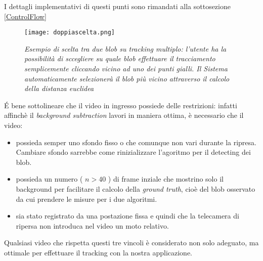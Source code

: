 I dettagli implementativi di questi punti sono rimandati alla sottosezione  \ref{ControlFlow}

\begin{figure}[hb]
\centering
	\texttt{[image: doppiascelta.png]}
\caption[Esempio di scelta tra due blob]{\textit{Esempio di scelta tra due blob su tracking multiplo: l'utente ha la possibilità di sccegliere su quale blob effettuare il tracciamento semplicemente cliccando vicino ad uno dei punti gialli. Il Sistema automaticamente selezionerà il blob più vicino attraverso il calcolo della distanza euclidea}\label{fig:scelta2blob}}
\end{figure}


\'E bene sottolineare che il video in ingresso possiede delle restrizioni: infatti affinchè il \textit{background subtraction} lavori in maniera ottima, è necessario che il video:
\begin{itemize}
 \item possieda semper uno sfondo fisso o che comunque non vari durante la ripresa. Cambiare sfondo sarrebbe come rinizializzare l'agoritmo per il detecting dei blob.
\item possieda un numero ( $n > 40 $ ) di frame inziale che mostrino solo il background per facilitare il calcolo della \textit{ground truth}, cioè del blob osservato da cui prendere le misure per i due algoritmi.
\item sia stato registrato da una postazione fissa e quindi che la telecamera di ripersa non introduca nel video un moto relativo.
 \end{itemize}

Qualsiasi video che rispetta questi tre vincoli è considerato non solo adeguato, ma ottimale per effettuare il tracking con la nostra applicazione.







